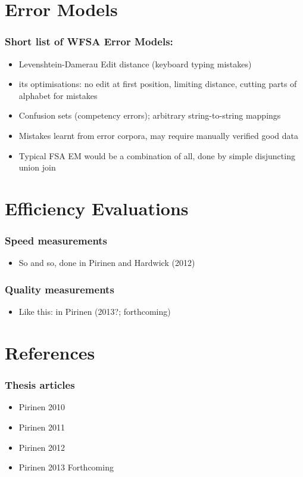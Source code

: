 \documentclass[t,12pt]{beamer}
\begin{document}
\section{Error Models}

\begin{frame}
    \frametitle{Short list of WFSA Error Models:}
    \begin{itemize}
        \item Levenshtein-Damerau Edit distance (keyboard typing mistakes)
        \item its optimisations: no edit at first position, limiting distance,
            cutting parts of alphabet for mistakes
        \item Confusion sets (competency errors); arbitrary string-to-string
            mappings
        \item Mistakes learnt from error corpora, may require manually verified
            good data
        \item Typical FSA EM would be a combination of all, done by simple
            disjuncting union join
    \end{itemize}
\end{frame}


\section{Efficiency Evaluations}

\begin{frame}
    \frametitle{Speed measurements}
    \begin{itemize}
        \item So and so, done in Pirinen and Hardwick (2012)
    \end{itemize}
\end{frame}

\begin{frame}
    \frametitle{Quality measurements}
    \begin{itemize}
        \item Like this: in Pirinen (2013?; forthcoming)
    \end{itemize}
\end{frame}

\section{References}

\begin{frame}
    \frametitle{Thesis articles}
    \begin{itemize}
        \item Pirinen 2010
        \item Pirinen 2011
        \item Pirinen 2012
        \item Pirinen 2013 Forthcoming
    \end{itemize}
\end{frame}
\end{document}
